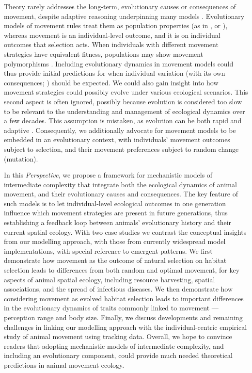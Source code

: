 Theory rarely addresses the long-term, evolutionary causes or consequences of movement, despite adaptive reasoning underpinning many models \citep{charnov1976,fretwell1970}.
Evolutionary models of movement rules treat them as population properties (as in \cite*[]{dejager2011,dejager2020}, or \cite*[]{morris2011}), whereas movement is an individual-level outcome, and it is on individual outcomes that selection acts.
When individuals with different movement strategies have equivalent fitness, populations may show movement polymorphisms \citep{wolf2012,shaw2020,getz2015}.
Including evolutionary dynamics in movement models could thus provide initial predictions for when individual variation (with its own consequences; \cite{spiegel2017}) should be expected.
We could also gain insight into how movement strategies could possibly evolve under various ecological scenarios.
This second aspect is often ignored, possibly because evolution is considered too slow to be relevant to the understanding and management of ecological dynamics over a few decades.
This assumption is mistaken, as evolution can be both rapid and adaptive \citep[][]{bonnet2022}.
Consequently, we additionally advocate for movement models to be embedded in an evolutionary context, with individuals' movement outcomes subject to selection, and their movement preferences subject to random change (mutation).

In this \textit{Perspective}, we propose a framework for mechanistic models of intermediate complexity that integrate both the ecological dynamics of animal movement, and their evolutionary causes and consequences.
The key feature of such models is to let individual-level ecological outcomes in one generation influence which movement strategies are present in future generations, thus establishing a feedback loop between animals' evolutionary history and their current spatial ecology.
With two case studies we contrast the conceptual insights from our modelling approach, with those from currently widespread model implementations, with special reference to emergent patterns.
We first demonstrate how movement as the outcome of natural selection on habitat selection leads to differences from both random and optimal movement, for key aspects of animal spatial ecology, including resource harvesting, spatial associations, and the spread of infectious diseases.
We then demonstrate how considering movement as evolved habitat selection leads to important differences in the evolutionary dynamics of traits commonly linked to movement ---  perception range and body size.
Finally, we discuss developments and remaining challenges in linking our modelling approach with the individual-centric empirical study of animal movement using tracking data.
Overall, we hope to convince readers that adopting mechanistic models of intermediate complexity, and including an evolutionary component, could provide much needed theoretical predictions in animal movement ecology.

